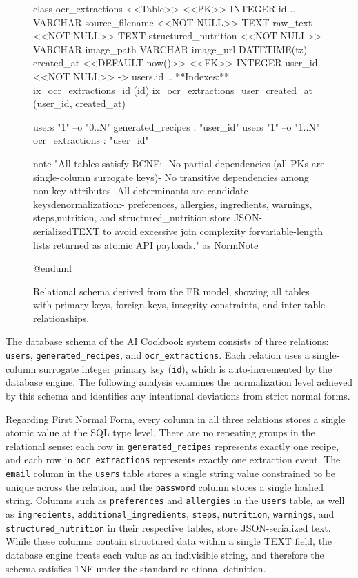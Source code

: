 \begin{figure}[htbp]
\begin{plantuml}
    class ocr_extractions <<Table>> {
        <<PK>> INTEGER id
        ..
        VARCHAR source_filename <<NOT NULL>>
        TEXT raw_text <<NOT NULL>>
        TEXT structured_nutrition <<NOT NULL>>
        VARCHAR image_path
        VARCHAR image_url
        DATETIME(tz) created_at <<DEFAULT now()>>
        <<FK>> INTEGER user_id <<NOT NULL>> -> users.id
        ..
        **Indexes:**
        ix_ocr_extractions_id (id)
        ix_ocr_extractions_user_created_at (user_id, created_at)
    }

    users "1" --o "0..N" generated_recipes : "user_id"
    users "1" --o "1..N" ocr_extractions : "user_id"

    note "All tables satisfy BCNF:\n- No partial dependencies (all PKs are single-column surrogate keys)\n- No transitive dependencies among non-key attributes\n- All determinants are candidate keys\n\nIntentional denormalization:\n- preferences, allergies, ingredients, warnings, steps,\n  nutrition, and structured_nutrition store JSON-serialized\n  TEXT to avoid excessive join complexity for\n  variable-length lists returned as atomic API payloads." as NormNote

    @enduml
    \end{plantuml}
    \caption{Relational schema derived from the ER model,
    showing all tables with primary keys, foreign keys,
    integrity constraints, and inter-table relationships.}
    \label{fig:relational-schema}
\end{figure}



The database schema of the AI Cookbook system consists of three
relations: \texttt{users}, \texttt{generated\_recipes}, and
\texttt{ocr\_extractions}. Each relation uses a single-column
surrogate integer primary key (\texttt{id}), which is
auto-incremented by the database engine. The following analysis
examines the normalization level achieved by this schema and
identifies any intentional deviations from strict normal forms.

Regarding First Normal Form, every column in all three relations
stores a single atomic value at the SQL type level. There are no
repeating groups in the relational sense: each row in
\texttt{generated\_recipes} represents exactly one recipe, and each
row in \texttt{ocr\_extractions} represents exactly one extraction
event. The \texttt{email} column in the \texttt{users} table stores
a single string value constrained to be unique across the relation,
and the \texttt{password} column stores a single hashed string.
Columns such as \texttt{preferences} and \texttt{allergies} in the
\texttt{users} table, as well as \texttt{ingredients},
\texttt{additional\_ingredients}, \texttt{steps}, \texttt{nutrition},
\texttt{warnings}, and \texttt{structured\_nutrition} in their
respective tables, store JSON-serialized text. While these columns
contain structured data within a single TEXT field, the database
engine treats each value as an indivisible string, and therefore the
schema satisfies 1NF under the standard relational definition.

